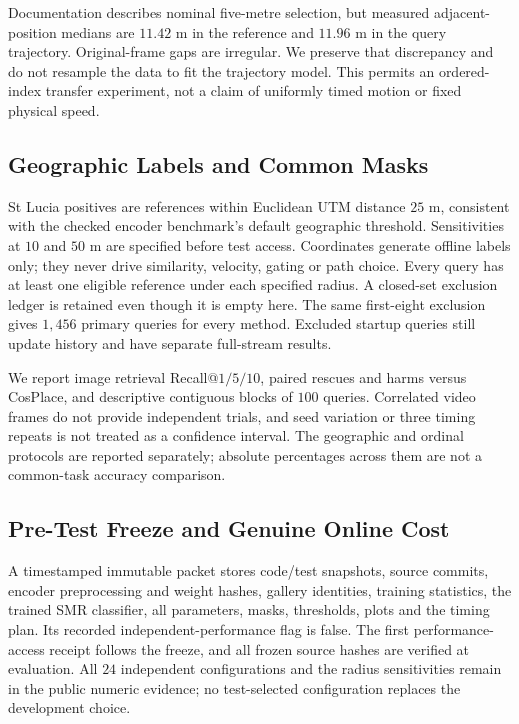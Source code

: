 \documentclass[conference]{IEEEtran}
\begin{document}
Documentation describes nominal five-metre selection, but measured adjacent-position medians are $11.42$ m in the reference and $11.96$ m in the query trajectory. Original-frame gaps are irregular. We preserve that discrepancy and do not resample the data to fit the trajectory model. This permits an ordered-index transfer experiment, not a claim of uniformly timed motion or fixed physical speed.

\subsection{Geographic Labels and Common Masks}
St Lucia positives are references within Euclidean UTM distance $25$ m, consistent with the checked encoder benchmark's default geographic threshold. Sensitivities at $10$ and $50$ m are specified before test access. Coordinates generate offline labels only; they never drive similarity, velocity, gating or path choice. Every query has at least one eligible reference under each specified radius. A closed-set exclusion ledger is retained even though it is empty here. The same first-eight exclusion gives $1,456$ primary queries for every method. Excluded startup queries still update history and have separate full-stream results.

We report image retrieval Recall@$1/5/10$, paired rescues and harms versus CosPlace, and descriptive contiguous blocks of $100$ queries. Correlated video frames do not provide independent trials, and seed variation or three timing repeats is not treated as a confidence interval. The geographic and ordinal protocols are reported separately; absolute percentages across them are not a common-task accuracy comparison.

\subsection{Pre-Test Freeze and Genuine Online Cost}
A timestamped immutable packet stores code/test snapshots, source commits, encoder preprocessing and weight hashes, gallery identities, training statistics, the trained SMR classifier, all parameters, masks, thresholds, plots and the timing plan. Its recorded independent-performance flag is false. The first performance-access receipt follows the freeze, and all frozen source hashes are verified at evaluation. All $24$ independent configurations and the radius sensitivities remain in the public numeric evidence; no test-selected configuration replaces the development choice.
\end{document}
